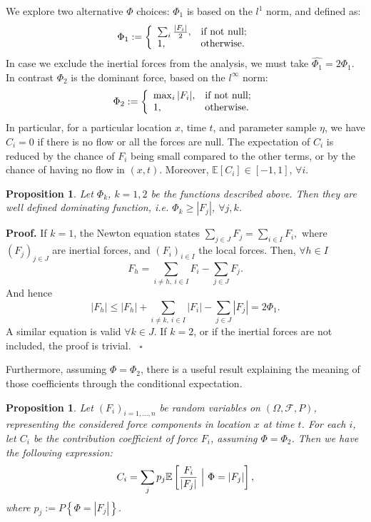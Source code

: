 \documentclass{article}
\newtheorem{proposition}[theorem]{Proposition}
\newenvironment{proof}[1][Proof]{\noindent\textbf{#1.} }{\ $\square$}
\begin{document}
We explore two alternative $\Phi$ choices: $\Phi_1$ is based on the $l^1$ norm, and defined as:
$$\Phi_1:=\left\{
    \begin{array}{ll}
      \sum_i \frac{|F_i|}{2}, & \hbox{if not null;} \\
      1, & \hbox{otherwise.}
    \end{array}
  \right.$$
In case we exclude the inertial forces from the analysis, we must take $\hat{\Phi_1}=2\Phi_1$. In contrast $\Phi_2$ is the dominant force, based on the $l^\infty$ norm:
$$\Phi_2:=\left\{
    \begin{array}{ll}
      \max_i |F_i|, & \hbox{if not null;} \\
      1, & \hbox{otherwise.}
    \end{array}
  \right.$$
In particular, for a particular location $x$, time $t$, and parameter sample $\eta$, we have $C_i=0$ if there is no flow or all the forces are null. The expectation of $C_i$ is reduced by the chance of $F_i$ being small compared to the other terms, or by the chance of having no flow in $(x,t)$. Moreover, $\mathbb E[C_i]\in[-1,1]$, $\forall i$.
\begin{proposition}
Let $\Phi_k$, $k=1,2$ be the functions described above. Then they are well defined dominating function, i.e. $\Phi_k\ge |F_j|$, $\forall j,k$.
\end{proposition}
\begin{proof}
If $k=1$, the Newton equation states $\sum_{j\in J} F_j =\sum_{i\in I} F_i,$ where $(F_j)_{j\in J}$ are inertial forces, and $(F_i)_{i\in I}$ the local forces. Then, $\forall h\in I$
$$F_h=\sum_{i\neq h,\ i\in I} F_i - \sum_{j\in J} F_j.$$
And hence
$$|F_h|\le |F_h|+\sum_{i\neq k,\ i\in I} |F_i| - \sum_{j\in J} |F_j|=2\Phi_1.$$
A similar equation is valid $\forall k\in J$. If $k=2$, or if the inertial forces are not included, the proof is trivial.
\end{proof}

Furthermore, assuming $\Phi=\Phi_2$, there is a useful result explaining the meaning of those coefficients through the conditional expectation.
\begin{proposition}
Let $(F_i)_{i=1,\dots, n}$ be random variables on $(\Omega, \mathcal F, P)$, representing the considered force components in location $x$ at time $t$. For each $i$, let $C_i$ be the contribution coefficient of force $F_i$, assuming $\Phi=\Phi_2$. Then we have the following expression:
$$C_i=\sum_j p_j \mathbb E\left[\frac{F_i}{|F_j|}\ \Big{|}\ \Phi=|F_j|\right],$$
where $p_j:=P\left\{\Phi=|F_j|\right\}$.
\end{proposition}
\end{document}

